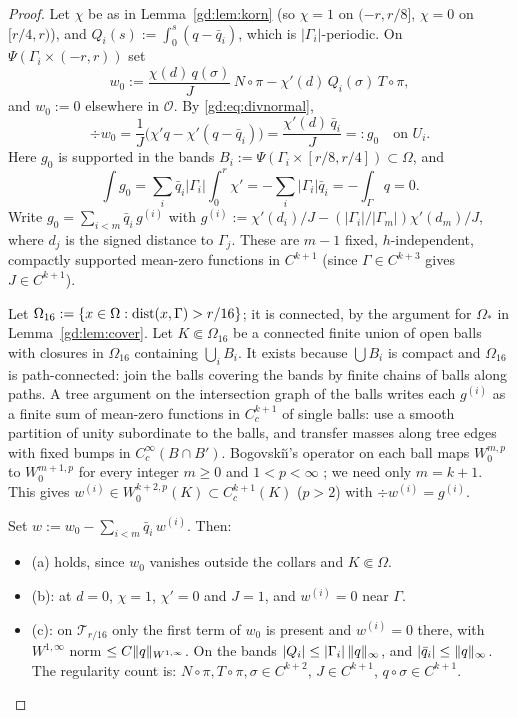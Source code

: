 \begin{proof}
Let $\chi$ be as in Lemma~\ref{gd:lem:korn} (so $\chi=1$ on $(-r,r/8]$, $\chi=0$ on $[r/4,r)$), and $Q_i(s):=\int_0^s(q-\bar q_i)$, which is $|\Gamma_i|$-periodic. On $\Psi(\Gamma_i\times(-r,r))$ set
\[
w_0:=\frac{\chi(d)\,q(\sigma)}{J}\,N\circ\pi-\chi'(d)\,Q_i(\sigma)\,T\circ\pi ,
\]
and $w_0:=0$ elsewhere in $\mathcal O$. By \eqref{gd:eq:divnormal},
\[
\div w_0=\frac1J\bigl(\chi'q-\chi'(q-\bar q_i)\bigr)=\frac{\chi'(d)\,\bar q_i}{J}=:g_0\quad\text{on }U_i .
\]
Here $g_0$ is supported in the bands $B_i:=\Psi(\Gamma_i\times[r/8,r/4])\subset\Omega$, and
\[
\int g_0=\sum_i\bar q_i|\Gamma_i|\int_0^r\chi'=-\sum_i|\Gamma_i|\bar q_i=-\int_\Gamma q=0 .
\]
Write $g_0=\sum_{i<m}\bar q_i\,g^{(i)}$ with $g^{(i)}:=\chi'(d_i)/J-(|\Gamma_i|/|\Gamma_m|)\chi'(d_m)/J$, where $d_j$ is the signed distance to $\Gamma_j$. These are $m-1$ fixed, $h$-independent, compactly supported mean-zero functions in $C^{k+1}$ (since $\Gamma\in C^{k+3}$ gives $J\in C^{k+1}$).

Let $\Omega_{16}:=\{x\in\Omega:\operatorname{dist}(x,\Gamma)>r/16\}$; it is connected, by the argument for $\Omega_\ast$ in Lemma~\ref{gd:lem:cover}. Let $K\Subset\Omega_{16}$ be a connected finite union of open balls with closures in $\Omega_{16}$ containing $\bigcup_iB_i$. It exists because $\bigcup B_i$ is compact and $\Omega_{16}$ is path-connected: join the balls covering the bands by finite chains of balls along paths. A tree argument on the intersection graph of the balls writes each $g^{(i)}$ as a finite sum of mean-zero functions in $C^{k+1}_c$ of single balls: use a smooth partition of unity subordinate to the balls, and transfer masses along tree edges with fixed bumps in $C^\infty_c(B\cap B')$. %
Bogovski\u{\i}'s operator on each ball maps $W^{m,p}_0$ to $W^{m+1,p}_0$ for every integer $m\ge0$ and $1<p<\infty$ \cite[Thm.~III.3.3]{Galdi}; we need only $m=k+1$. This gives $w^{(i)}\in W^{k+2,p}_0(K)\subset C^{k+1}_c(K)$ ($p>2$) with $\div w^{(i)}=g^{(i)}$.

Set $w:=w_0-\sum_{i<m}\bar q_i\,w^{(i)}$. Then:
\begin{itemize}
\item (a) holds, since $w_0$ vanishes outside the collars and $K\Subset\Omega$.
\item (b): at $d=0$, $\chi=1$, $\chi'=0$ and $J=1$, and $w^{(i)}=0$ near $\Gamma$.
\item (c): on $\mathcal T_{r/16}$ only the first term of $w_0$ is present and $w^{(i)}=0$ there, with $W^{1,\infty}$ norm $\le C\lVert q\rVert_{W^{1,\infty}}$. On the bands $|Q_i|\le|\Gamma_i|\,\lVert q\rVert_\infty$, and $|\bar q_i|\le\lVert q\rVert_\infty$. The regularity count is: $N\circ\pi,T\circ\pi,\sigma\in C^{k+2}$, $J\in C^{k+1}$, $q\circ\sigma\in C^{k+1}$.\qedhere
\end{itemize}
\end{proof}

